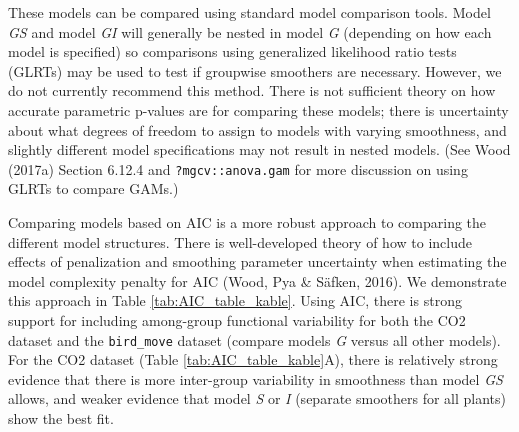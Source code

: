 \documentclass[12pt]{article}
\begin{document}
These models can be compared using standard model comparison tools.
Model \emph{GS} and model \emph{GI} will generally be nested in model
\emph{G} (depending on how each model is specified) so comparisons using
generalized likelihood ratio tests (GLRTs) may be used to test if
groupwise smoothers are necessary. However, we do not currently
recommend this method. There is not sufficient theory on how accurate
parametric p-values are for comparing these models; there is uncertainty
about what degrees of freedom to assign to models with varying
smoothness, and slightly different model specifications may not result
in nested models. (See Wood (2017a) Section 6.12.4 and
\texttt{?mgcv::anova.gam} for more discussion on using GLRTs to compare
GAMs.)

Comparing models based on AIC is a more robust approach to comparing the
different model structures. There is well-developed theory of how to
include effects of penalization and smoothing parameter uncertainty when
estimating the model complexity penalty for AIC (Wood, Pya \& Säfken,
2016). We demonstrate this approach in Table \ref{tab:AIC_table_kable}.
Using AIC, there is strong support for including among-group functional
variability for both the CO2 dataset and the \texttt{bird\_move} dataset
(compare models \emph{G} versus all other models). For the CO2 dataset
(Table \ref{tab:AIC_table_kable}A), there is relatively strong evidence
that there is more inter-group variability in smoothness than model
\emph{GS} allows, and weaker evidence that model \emph{S} or \emph{I}
(separate smoothers for all plants) show the best fit.
\end{document}
